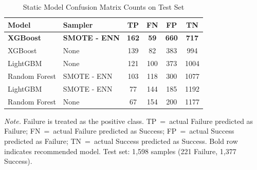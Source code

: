 \begin{table}[htbp]
\caption{Static Model Confusion Matrix Counts on Test Set}
\label{tab:static_confusion_matrix}
\small
\begin{tabular}{llcccc}
\toprule
Model & Sampler & TP & FN & FP & TN \\
\midrule
\textbf{XGBoost} & \textbf{SMOTE - ENN} & \textbf{162} & \textbf{59} & \textbf{660} & \textbf{717} \\
XGBoost & None & 139 & 82 & 383 & 994 \\
LightGBM & None & 121 & 100 & 373 & 1004 \\
Random Forest & SMOTE - ENN & 103 & 118 & 300 & 1077 \\
LightGBM & SMOTE - ENN & 77 & 144 & 185 & 1192 \\
Random Forest & None & 67 & 154 & 200 & 1177 \\
\bottomrule
\end{tabular}

{\footnotesize \textit{Note.} Failure is treated as the positive class. TP~=~actual Failure predicted as Failure; FN~=~actual Failure predicted as Success; FP~=~actual Success predicted as Failure; TN~=~actual Success predicted as Success. Bold row indicates recommended model. Test set: 1{,}598 samples (221 Failure, 1{,}377 Success).}
\end{table}